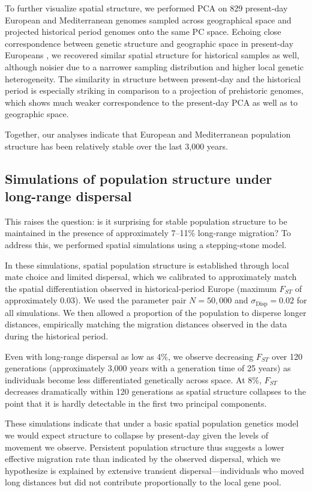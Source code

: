 \documentclass[11pt]{article}
\begin{document}
To further visualize spatial structure, we performed PCA on 829 present-day European and Mediterranean genomes sampled across geographical space and projected historical period genomes onto the same PC space. Echoing close correspondence between genetic structure and geographic space in present-day Europeans \citep{novembre2008}, we recovered similar spatial structure for historical samples as well, although noisier due to a narrower sampling distribution and higher local genetic heterogeneity. The similarity in structure between present-day and the historical period is especially striking in comparison to a projection of prehistoric genomes, which shows much weaker correspondence to the present-day PCA as well as to geographic space.

Together, our analyses indicate that European and Mediterranean population structure has been relatively stable over the last 3,000 years.

\subsection{Simulations of population structure under long-range dispersal}

This raises the question: is it surprising for stable population structure to be maintained in the presence of approximately 7--11\% long-range migration? To address this, we performed spatial simulations using a stepping-stone model.

In these simulations, spatial population structure is established through local mate choice and limited dispersal, which we calibrated to approximately match the spatial differentiation observed in historical-period Europe (maximum $F_{ST}$ of approximately 0.03). We used the parameter pair $N = 50{,}000$ and $\sigma_{\text{Disp}} = 0.02$ for all simulations. We then allowed a proportion of the population to disperse longer distances, empirically matching the migration distances observed in the data during the historical period.

Even with long-range dispersal as low as 4\%, we observe decreasing $F_{ST}$ over 120 generations (approximately 3,000 years with a generation time of 25 years) as individuals become less differentiated genetically across space. At 8\%, $F_{ST}$ decreases dramatically within 120 generations as spatial structure collapses to the point that it is hardly detectable in the first two principal components.

These simulations indicate that under a basic spatial population genetics model we would expect structure to collapse by present-day given the levels of movement we observe. Persistent population structure thus suggests a lower effective migration rate than indicated by the observed dispersal, which we hypothesize is explained by extensive transient dispersal---individuals who moved long distances but did not contribute proportionally to the local gene pool.
\end{document}
